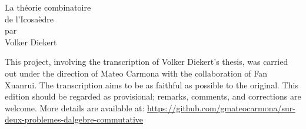 \documentclass[12pt,twoside]{report} %
\begin{document}
\setcounter{tocdepth}{2}
\sloppy


\thispagestyle{empty}
\noindent\makebox[\linewidth]{\rule{4in}{0.01in}}
\vspace*{\fill}
\begin{center}
    {\Huge La théorie combinatoire} \\
    \vspace{0.5em}
    {\Huge de l'Icosaèdre} \\
    \vspace{0.5em}
    {\Large par} \\
    \vspace{0.5em}
    {\huge Volker Diekert}
\end{center}
\vspace*{\fill}
\noindent\makebox[\linewidth]{\rule{4in}{0.01in}}

\newpage 
\thispagestyle{empty}

\null\vfill
\noindent\begin{minipage}{\textwidth}
This project, involving the transcription of Volker Diekert's thesis, was carried out under the direction of Mateo Carmona with the collaboration of Fan Xuanrui. The transcription aims to be as faithful as possible to the original. This edition should be regarded as provisional; remarks, comments, and corrections are welcome. More details are available at: \url{https://github.com/gmateocarmona/sur-deux-problemes-dalgebre-commutative}
\end{minipage}

\newpage
\thispagestyle{empty}
\mbox{}


\renewcommand{\contentsname}{TABLE DES MATIÈRES}
\tableofcontents\thispagestyle{empty}

\setcounter{page}{0}




\newpage
\mbox{}
\thispagestyle{empty}
\end{document}
